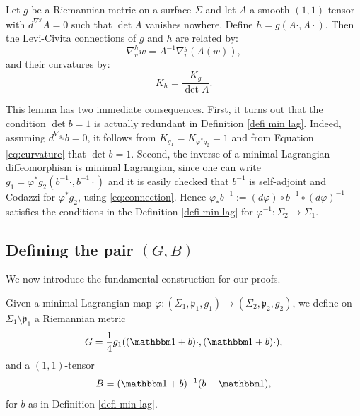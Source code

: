 \begin{lemma} \label{lemma KS}
Let $g$ be a Riemannian metric on a surface $\Sigma$ and let $A$ a smooth $(1,1)$ tensor with $d^{\nabla^g}\!\!A=0$ such that $\det A$ vanishes nowhere. Define $h=g(A\cdot,A\cdot)$. Then the Levi-Civita connections of $g$ and $h$ are related by:
\begin{equation}\label{eq:connection}
\nabla^h_v w=A^{-1}\nabla^g_v(A(w)),
\end{equation}
and their curvatures by:
\begin{equation}\label{eq:curvature}
K_h=\frac{K_g}{\det A}.
\end{equation}
\end{lemma}

\begin{remark} \label{rmk:detb}
This lemma has two immediate consequences. First, it turns out that the condition $\det b=1$ is actually redundant in Definition \ref{defi min lag}. Indeed, assuming $d^{\nabla_{g_1}}b=0$, it follows from $K_{g_1}=K_{\varphi^*g_2}=1$ and from Equation \eqref{eq:curvature} that
$\det b=1$. Second, the inverse of a minimal Lagrangian diffeomorphism is minimal Lagrangian, since one can write $g_1=\varphi^*g_2(b^{-1}\cdot,b^{-1}\cdot)$ and it is easily checked that $b^{-1}$ is self-adjoint and Codazzi for $\varphi^*g_2$, using \eqref{eq:connection}. Hence $\varphi_*b^{-1}:=(d\varphi)\circ b^{-1}\circ (d\varphi)^{-1}$ satisfies the conditions in the Definition \ref{defi min lag} for $\varphi^{-1}:\Sigma_2\to\Sigma_1$.
\end{remark}

\subsection{Defining the pair $(G,B)$}
We now introduce the fundamental construction for our proofs.

\begin{defi} \label{defi GB}
Given a minimal Lagrangian map $\varphi:(\Sigma_1,\mathfrak p_1,g_1)\to (\Sigma_2,\mathfrak p_2,g_2)$, we define on $\Sigma_1\setminus\mathfrak p_1$ a Riemannian metric
\[
G=\frac{1}{4}g_1((\mathbbm 1+b)\cdot,(\mathbbm 1+b)\cdot),
\]
and a $(1,1)$-tensor
\[
B=(\mathbbm 1+b)^{-1}(b-\mathbbm 1),
\]
for $b$ as in Definition \ref{defi min lag}.
\end{defi}

